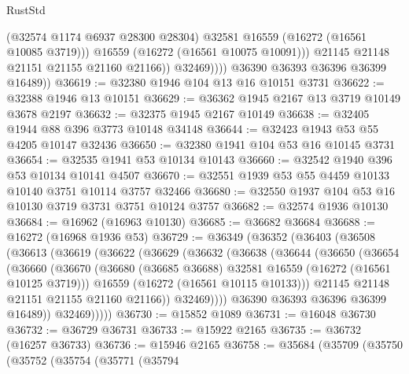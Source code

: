\begin{lexlean}{RustStd}
\begin{coremodule}
                        (@32574 @1174 @6937 @28300 @28304)
                        @32581
                        @16559
                        (@16272 (@16561 @10085 @3719)))
                      @16559
                      (@16272 (@16561 @10075 @10091)))
                    @21145
                    @21148
                    @21151
                    @21155
                    @21160
                    @21166))
                @32469))))
        @36390
        @36393
        @36396
        @36399
        @16489))
@36619 := @32380 @1946 @104 @13 @16 @10151 @3731
@36622 := @32388 @1946 @13 @10151
@36629 := @36362 @1945 @2167 @13 @3719 @10149 @3678 @2197
@36632 := @32375 @1945 @2167 @10149
@36638 := @32405 @1944 @88 @396 @3773 @10148 @34148
@36644 := @32423 @1943 @53 @55 @4205 @10147 @32436
@36650 := @32380 @1941 @104 @53 @16 @10145 @3731
@36654 := @32535 @1941 @53 @10134 @10143
@36660 := @32542 @1940 @396 @53 @10134 @10141 @4507
@36670 := @32551 @1939 @53 @55 @4459 @10133 @10140 @3751 @10114 @3757 @32466
@36680 := @32550 @1937 @104 @53 @16 @10130 @3719 @3731 @3751 @10124 @3757
@36682 := @32574 @1936 @10130
@36684 := @16962 (@16963 @10130)
@36685 := @36682 @36684
@36688 := @16272 (@16968 @1936 @53)
@36729 := @36349
    (@36352
      (@36403
        (@36508
          (@36613
            (@36619
              (@36622
                (@36629
                  (@36632
                    (@36638
                      (@36644
                        (@36650
                          (@36654
                            (@36660
                              (@36670
                                (@36680
                                  (@36685 @36688)
                                  @32581
                                  @16559
                                  (@16272 (@16561 @10125 @3719)))
                                @16559
                                (@16272 (@16561 @10115 @10133)))
                              @21145
                              @21148
                              @21151
                              @21155
                              @21160
                              @21166))
                          @32469))))
                  @36390
                  @36393
                  @36396
                  @36399
                  @16489))
              @32469)))))
@36730 := @15852 @1089
@36731 := @16048 @36730
@36732 := @36729 @36731
@36733 := @15922 @2165
@36735 := @36732 (@16257 @36733)
@36736 := @15946 @2165
@36758 := @35684
    (@35709
      (@35750
        (@35752
          (@35754
            (@35771
              (@35794

\end{coremodule}
\end{lexlean}
